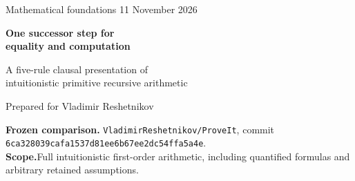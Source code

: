\documentclass[11pt,letterpaper]{article}
\theoremstyle{definition}
\begin{document}
\begin{titlepage}
\vspace*{1.0cm}
{\large Mathematical foundations \hfill 11 November 2026\par}
\vspace{1.2cm}
{\LARGE\bfseries One successor step for\\[4pt]
equality and computation\par}
\vspace{0.6cm}
{\Large A five-rule clausal presentation of\\
intuitionistic primitive recursive arithmetic\par}
\vspace{0.9cm}
{\large Prepared for Vladimir Reshetnikov\par}
\vspace{1.0cm}
\begin{abstract}
We give a simpler arithmetic inference interface for the current
\texttt{ConciseIPRA} proposal. On its already available zero-normal
iterator syntax, reflexivity and one uniform successor-evaluation rule
derive both computation and arbitrary equational transport. The three
syntactic alternatives of the current computational-equality rule are
replaced by one. The key is an explicit two-step derivation of equality
composition using a one-step identity iterator.

Together with the existing clausal logical interface, the complete
presentation has five primitive rule schemes: Use, Refl, Step, DE, and
DI. Its formulas are only equations and one two-variable binder.
We prove exact consequence equivalence with the native kernel and
therefore whole-domain bi-interpretability and equiconsistency with
full first-order iPRA. Both numerical composites have the identity
graph \(x=y\).

The fully validated standalone Python checker measures
\StepBytes\ normalized bytes, \StepTokens\ significant tokens, and
\StepAST\ AST nodes. A matched zero-normal computation/transport
control measures \ControlBytes, \ControlTokens, and \ControlAST,
respectively. The comparison counts normalization, syntax validation,
scope handling, clause storage, and the command-line interface.
The contribution is a local mathematical and implementation reduction;
no absolute minimum is asserted. The new equivalence is a written
proof supported by executable proof translations and boundary tests,
not a new Lean or Rocq verification.
\end{abstract}
\vfill
\textbf{Frozen comparison.}\quad
\texttt{VladimirReshetnikov/ProveIt}, commit\\
\texttt{6ca328039cafa1537d81ee6b67ee2dc54ffa5a4e}.\\
\textbf{Scope.}\quad Full intuitionistic first-order arithmetic,
including quantified formulas and arbitrary retained assumptions.
\end{titlepage}
\tableofcontents
\clearpage
\end{document}
